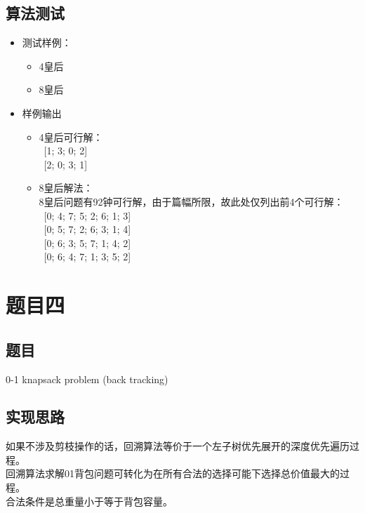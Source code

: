 \documentclass[a4paper]{article}
\begin{document}
\subsection{算法测试}

\begin{itemize}
\item
    测试样例：
    \begin{itemize}
    \item
        4皇后
    \item
        8皇后
    \end{itemize}
\item
    样例输出
    \begin{itemize}
    \item
        4皇后可行解：\\
        \ [1; 3; 0; 2]\\
        \ [2; 0; 3; 1]
    \item
        8皇后解法：\\
        8皇后问题有92钟可行解，由于篇幅所限，故此处仅列出前4个可行解：\\
        \ [0; 4; 7; 5; 2; 6; 1; 3] \\
        \ [0; 5; 7; 2; 6; 3; 1; 4] \\
        \ [0; 6; 3; 5; 7; 1; 4; 2] \\
        \ [0; 6; 4; 7; 1; 3; 5; 2]

    \end{itemize}
\end{itemize}

\section{题目四}

\subsection{题目}

0-1 knapsack problem (back tracking)

\subsection{实现思路}

如果不涉及剪枝操作的话，回溯算法等价于一个左子树优先展开的深度优先遍历过程。\\
回溯算法求解01背包问题可转化为在所有合法的选择可能下选择总价值最大的过程。\\
合法条件是总重量小于等于背包容量。
\end{document}
